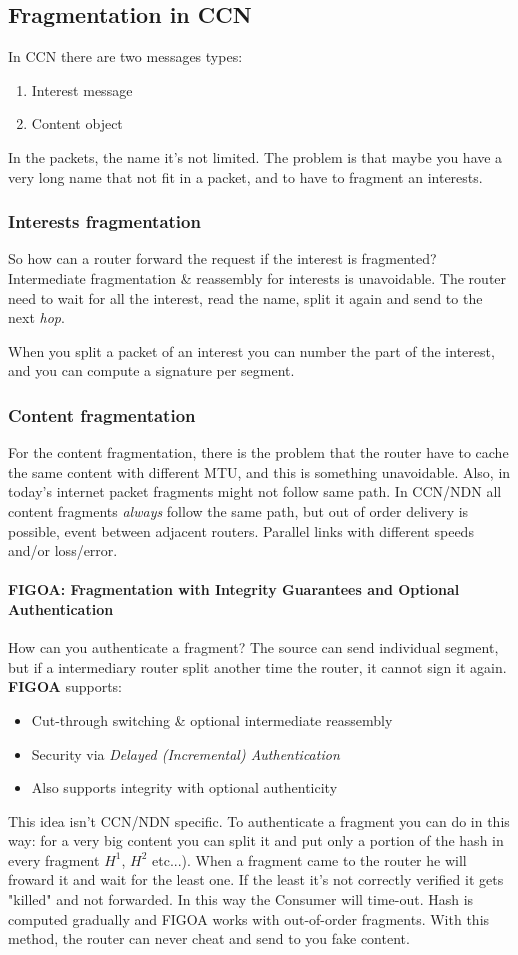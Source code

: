 \subsection{Fragmentation in CCN} In CCN there are two messages types:
\begin{enumerate}
  \item Interest message
  \item Content object
\end{enumerate}
In the packets, the name it's not limited. The problem is that maybe you have a
very long name that not fit in a packet, and to have to fragment an interests.

\subsubsection{Interests fragmentation} So how can a router forward the request
if the interest is fragmented?
Intermediate fragmentation & reassembly for interests is unavoidable. The
router need to wait for all the interest, read the name, split it again and
send to the next \textit{hop}.

When you split a packet of an interest you can number the part of the interest,
and you can compute a signature per segment.

\subsubsection{Content fragmentation} For the content fragmentation, there is
the problem that the router have to cache the same content with different MTU,
and this is something unavoidable.
Also, in today's internet packet fragments might not follow same path. In
CCN/NDN all content fragments \textit{always} follow the same path, but out of
order delivery is possible, event between adjacent routers. Parallel links with
different speeds and/or loss/error.

\paragraph*{FIGOA: Fragmentation with Integrity Guarantees and Optional
Authentication} How can you authenticate a fragment? The source can send
individual segment, but if a intermediary router split another time the router,
it cannot sign it again.
\textbf{FIGOA} supports:
\begin{itemize}
  \item Cut-through switching & optional intermediate reassembly
  \item Security via \textit{Delayed (Incremental) Authentication}
  \item Also supports integrity with optional authenticity
\end{itemize}
This idea isn't CCN/NDN specific.
To authenticate a fragment you can do in this way: for a very big content you
can split it and put only a portion of the hash in every fragment $H^1$, $H^2$
etc...). When a fragment came to the router he will froward it and wait for the
least one. If the least it's not correctly verified it gets "killed" and not
forwarded. In this way the Consumer will time-out.
Hash is computed gradually and FIGOA works with out-of-order fragments.
With this method, the router can never cheat and send to you fake content.
